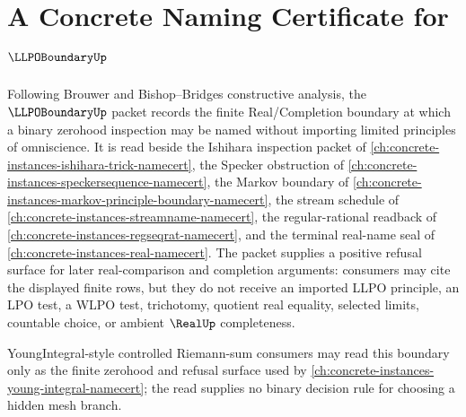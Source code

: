 \chapter{A Concrete Naming Certificate for $\LLPOBoundaryUp$}
\label{ch:concrete-instances-llpo-boundary-namecert}

Following Brouwer and Bishop--Bridges constructive analysis, the $\LLPOBoundaryUp$ packet records the finite Real/Completion boundary at which a binary zerohood inspection may be named without importing limited principles of omniscience. It is read beside the Ishihara inspection packet of \autoref{ch:concrete-instances-ishihara-trick-namecert}, the Specker obstruction of \autoref{ch:concrete-instances-speckersequence-namecert}, the Markov boundary of \autoref{ch:concrete-instances-markov-principle-boundary-namecert}, the stream schedule of \autoref{ch:concrete-instances-streamname-namecert}, the regular-rational readback of \autoref{ch:concrete-instances-regseqrat-namecert}, and the terminal real-name seal of \autoref{ch:concrete-instances-real-namecert}. The packet supplies a positive refusal surface for later real-comparison and completion arguments: consumers may cite the displayed finite rows, but they do not receive an imported LLPO principle, an LPO test, a WLPO test, trichotomy, quotient real equality, selected limits, countable choice, or ambient $\RealUp$ completeness.

YoungIntegral-style controlled Riemann-sum consumers may read this boundary only as the finite zerohood and refusal surface used by \autoref{ch:concrete-instances-young-integral-namecert}; the read supplies no binary decision rule for choosing a hidden mesh branch.

